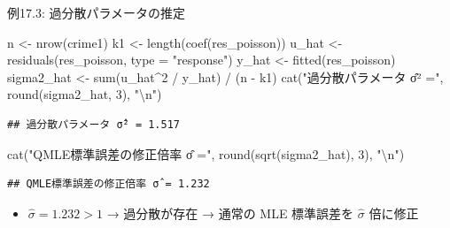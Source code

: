 \documentclass[
  ignorenonframetext,
]{beamer}
\newenvironment{Shaded}{\begin{snugshade}}{\end{snugshade}}
\newcommand{\AttributeTok}[1]{\textcolor[rgb]{0.77,0.63,0.00}{#1}}
\newcommand{\DecValTok}[1]{\textcolor[rgb]{0.00,0.00,0.81}{#1}}
\newcommand{\FunctionTok}[1]{\textcolor[rgb]{0.00,0.00,0.00}{#1}}
\newcommand{\NormalTok}[1]{#1}
\newcommand{\OtherTok}[1]{\textcolor[rgb]{0.56,0.35,0.01}{#1}}
\newcommand{\SpecialCharTok}[1]{\textcolor[rgb]{0.00,0.00,0.00}{#1}}
\newcommand{\StringTok}[1]{\textcolor[rgb]{0.31,0.60,0.02}{#1}}
\providecommand{\tightlist}{%
  \setlength{\itemsep}{0pt}\setlength{\parskip}{0pt}}
\begin{document}
\begin{frame}[fragile]{例17.3: 過分散パラメータの推定}
\protect\hypertarget{ux4f8b17.3-ux904eux5206ux6563ux30d1ux30e9ux30e1ux30fcux30bfux306eux63a8ux5b9a}{}
\footnotesize

\begin{Shaded}
\begin{Highlighting}[]
\NormalTok{n   }\OtherTok{\textless{}{-}} \FunctionTok{nrow}\NormalTok{(crime1)}
\NormalTok{k1  }\OtherTok{\textless{}{-}} \FunctionTok{length}\NormalTok{(}\FunctionTok{coef}\NormalTok{(res\_poisson))}
\NormalTok{u\_hat }\OtherTok{\textless{}{-}} \FunctionTok{residuals}\NormalTok{(res\_poisson, }\AttributeTok{type =} \StringTok{"response"}\NormalTok{)}
\NormalTok{y\_hat }\OtherTok{\textless{}{-}} \FunctionTok{fitted}\NormalTok{(res\_poisson)}
\NormalTok{sigma2\_hat }\OtherTok{\textless{}{-}} \FunctionTok{sum}\NormalTok{(u\_hat}\SpecialCharTok{\^{}}\DecValTok{2} \SpecialCharTok{/}\NormalTok{ y\_hat) }\SpecialCharTok{/}\NormalTok{ (n }\SpecialCharTok{{-}}\NormalTok{ k1)}
\FunctionTok{cat}\NormalTok{(}\StringTok{"過分散パラメータ σ̂² ="}\NormalTok{, }\FunctionTok{round}\NormalTok{(sigma2\_hat, }\DecValTok{3}\NormalTok{), }\StringTok{"}\SpecialCharTok{\textbackslash{}n}\StringTok{"}\NormalTok{)}
\end{Highlighting}
\end{Shaded}

\begin{verbatim}
## 過分散パラメータ σ̂² = 1.517
\end{verbatim}

\begin{Shaded}
\begin{Highlighting}[]
\FunctionTok{cat}\NormalTok{(}\StringTok{"QMLE標準誤差の修正倍率 σ̂ ="}\NormalTok{, }\FunctionTok{round}\NormalTok{(}\FunctionTok{sqrt}\NormalTok{(sigma2\_hat), }\DecValTok{3}\NormalTok{), }\StringTok{"}\SpecialCharTok{\textbackslash{}n}\StringTok{"}\NormalTok{)}
\end{Highlighting}
\end{Shaded}

\begin{verbatim}
## QMLE標準誤差の修正倍率 σ̂ = 1.232
\end{verbatim}

\normalsize

\begin{itemize}
\tightlist
\item
  \(\hat{\sigma} = 1.232 > 1\) → 過分散が存在 → 通常の MLE 標準誤差を
  \(\hat{\sigma}\) 倍に修正
\end{itemize}
\end{frame}
\end{document}
